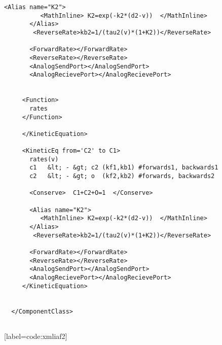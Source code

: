 \documentclass[draftspec]{ninemlspec}
\begin{document}
\begin{lstlisting}[label=code:xmliaf2]
	   <Alias name="K2">
	 	  <MathInline> K2=exp(-k2*(d2-v))  </MathInline>
	   </Alias>
		<ReverseRate>kb2=1/(tau2(v)*(1+K2))</ReverseRate>

	   <ForwardRate></ForwardRate>
	   <ReverseRate></ReverseRate>
	   <AnalogSendPort></AnalogSendPort>
	   <AnalogRecievePort></AnalogRecievePort>


	 <Function>
       rates
	 </Function>

	 </KineticEquation>

     <KineticEq from='C2' to C1>
       rates(v) 
       c1   &lt; - &gt; c2 (kf1,kb1) #forwards1, backwards1
       c2   &lt; - &gt; o  (kf2,kb2) #forwards, backwards2 
       
	   <Conserve>  C1+C2+O=1  </Conserve>
	  	
	   <Alias name="K2">
	 	  <MathInline> K2=exp(-k2*(d2-v))  </MathInline>
	   </Alias>
		<ReverseRate>kb2=1/(tau2(v)*(1+K2))</ReverseRate>

	   <ForwardRate></ForwardRate>
	   <ReverseRate></ReverseRate>
	   <AnalogSendPort></AnalogSendPort>
	   <AnalogRecievePort></AnalogRecievePort>
	 </KineticEquation>

	  
  </ComponentClass>
  
\end{lstlisting}[label=code:xmliaf2]


\clearpage


\end{document}
